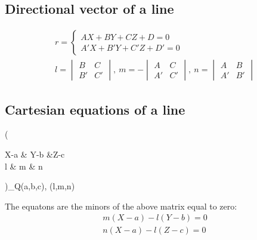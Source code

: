 \documentclass{article}
\begin{document}
    \subsection*{Directional vector of a line}
        \begin{gather*}
            r =\begin{cases}
                AX + BY + CZ + D = 0 \\
                A'X + B'Y + C'Z + D' = 0
            \end{cases} \\
            l = \begin{vmatrix}
                B & C \\ B' & C'
            \end{vmatrix}, \
            m = - \begin{vmatrix}
                A & C \\ A' & C'
            \end{vmatrix}, \
            n = \begin{vmatrix}
                A & B \\ A' & B'
            \end{vmatrix}    
        \end{gather*}
    \subsection*{Cartesian equations of a line}
        \begin{flalign*}
            \left(\begin{matrix}
                X-a & Y-b &Z-c \\
                l & m & n
            \end{matrix}\right)_{Q\equiv (a,b,c), (l,m,n)}
        \end{flalign*}
        The equatons are the minors of the above matrix equal to zero:
        \begin{gather*}
            m\left( X - a \right) - l\left( Y - b\right) = 0 \\
            n\left( X - a \right) - l\left( Z - c\right) = 0  
        \end{gather*}
        
\end{document}
